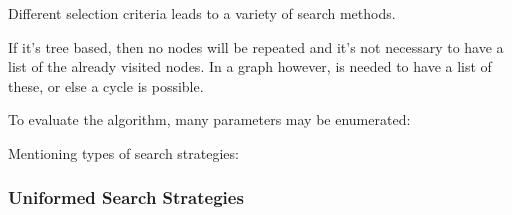 Different selection criteria leads to a variety of search methods.

If it's tree based, then no nodes will be repeated and it's not necessary to have a list of the already visited nodes. In a graph however, is needed to have a list of these, or else a cycle is possible.

To evaluate the algorithm, many parameters may be enumerated:


\vspace{.5cm}
Mentioning types of search strategies:



\subsubsection{Uniformed Search Strategies}

